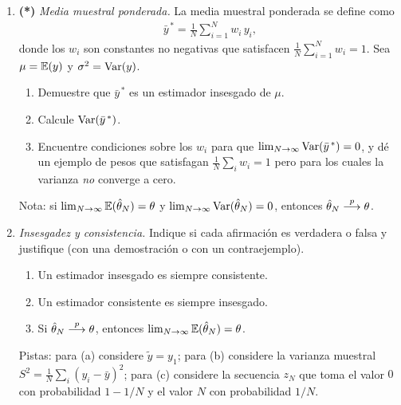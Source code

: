 \documentclass[letterpaper,11pt]{article}
\begin{document}
\begin{enumerate}[itemsep=1.2em]

\item \textbf{(*)} \emph{Media muestral ponderada.} La media muestral ponderada se define como
    \begin{align*}
    \bar y^{\,*} = \frac{1}{N}\sum_{i=1}^{N} w_i\, y_i,
    \end{align*}
    donde los $w_i$ son constantes no negativas que satisfacen $\frac{1}{N}\sum_{i=1}^N w_i=1$.
    Sea $\mu=\operatorname{\mathbb{E}}(y)$ y $\sigma^2=\operatorname{Var}(y)$.
    \begin{enumerate}
        \item Demuestre que $\bar y^{\,*}$ es un estimador insesgado de $\mu$.
        \item Calcule $\operatorname{Var}(\bar y^{\,*})$.
        \item Encuentre condiciones sobre los $w_i$ para que $\lim_{N\to\infty}\operatorname{Var}(\bar y^{\,*})=0$,
              y dé un ejemplo de pesos que satisfagan $\frac{1}{N}\sum_i w_i=1$ pero para los
              cuales la varianza \emph{no} converge a cero.
    \end{enumerate}
    Nota: si $\lim_{N\to\infty}\operatorname{\mathbb{E}}(\hat\theta_N)=\theta$ y $\lim_{N\to\infty}\operatorname{Var}(\hat\theta_N)=0$,
    entonces $\hat\theta_N\stackrel{p}{\longrightarrow}\theta$.

\item \emph{Insesgadez y consistencia.} Indique si cada afirmación es verdadera o falsa y
    justifique (con una demostración o con un contraejemplo).
    \begin{enumerate}
        \item Un estimador insesgado es siempre consistente.
        \item Un estimador consistente es siempre insesgado.
        \item Si $\hat\theta_N\stackrel{p}{\longrightarrow}\theta$, entonces $\lim_{N\to\infty}\operatorname{\mathbb{E}}(\hat\theta_N)=\theta$.
    \end{enumerate}
    Pistas: para (a) considere $\tilde y = y_1$; para (b) considere la varianza muestral
    $S^2=\frac{1}{N}\sum_i (y_i-\bar y)^2$; para (c) considere la secuencia $z_N$ que toma el
    valor $0$ con probabilidad $1-1/N$ y el valor $N$ con probabilidad $1/N$.


\end{enumerate}
\end{document}
